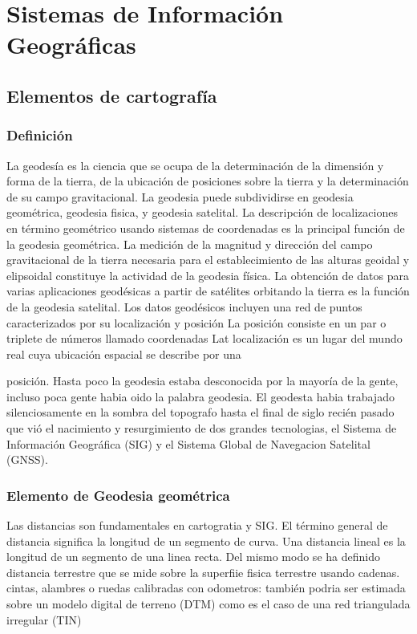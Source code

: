 \chapter{Sistemas de Información Geográficas}

\section{Elementos de cartografía}
\subsection{Definición}
La geodesía es la ciencia que se ocupa de la determinación de la dimensión y forma de la tierra, de la ubicación de posiciones sobre la tierra y la determinación de su campo gravitacional. La geodesia puede subdividirse en geodesia geométrica, geodesia fisica, y geodesia satelital. La descripción de localizaciones en término geométrico usando sistemas de coordenadas es la principal función de la geodesia geométrica. La medición de la magnitud y dirección del campo gravitacional de la tierra necesaria para el establecimiento de las alturas geoidal y elipsoidal constituye la actividad de la geodesia física. La obtención de datos para varias aplicaciones geodésicas a partir de satélites orbitando la tierra es la función de la geodesia satelital. Los datos geodésicos incluyen una red de puntos caracterizados por su localización y posición La posición consiste en un par o triplete de números llamado coordenadas Lat localización es un lugar del mundo real cuya ubicación espacial se describe por una

posición. Hasta poco la geodesia estaba desconocida por la mayoría de la gente, incluso poca gente habia oido la palabra geodesia. El geodesta habia trabajado silenciosamente en la sombra del topografo hasta el final de siglo recién pasado que vió el nacimiento y resurgimiento de dos grandes tecnologias, el Sistema de Información Geográfica (SIG) y el Sistema Global de Navegacion Satelital (GNSS).

\subsection{Elemento de Geodesia geométrica}

\begin{definition}[Distancia]
    Las distancias son fundamentales en cartogratia y SIG. El término general de distancia significa la longitud de un segmento de curva. Una distancia lineal es la longitud de un segmento de una linea recta. Del mismo modo se ha definido distancia terrestre que se mide sobre la superfiie fisica terrestre usando cadenas. cintas, alambres o ruedas calibradas con odometros: también podria ser estimada sobre un modelo digital de terreno (DTM) como es el caso de una red triangulada irregular (TIN)    
\end{definition}

